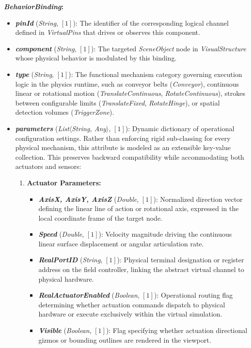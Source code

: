 \textbf{\textit{BehaviorBinding}:}
\begin{itemize}
    \item \textbf{\textit{pinId}} (\textit{String}, $[1]$): The identifier of the corresponding logical channel defined in \textit{VirtualPins} that drives or observes this component.
    \item \textbf{\textit{component}} (\textit{String}, $[1]$): The targeted \textit{SceneObject} node in \textit{VisualStructure} whose physical behavior is modulated by this binding.
    \item \textbf{\textit{type}} (\textit{String}, $[1]$): The functional mechanism category governing execution logic in the physics runtime, such as conveyor belts (\textit{Conveyor}), continuous linear or rotational motion (\textit{TranslateContinuous}, \textit{RotateContinuous}), strokes between configurable limits (\textit{TranslateFixed}, \textit{RotateHinge}), or spatial detection volumes (\textit{TriggerZone}).
    \item \textbf{\textit{parameters}} (\textit{List$\langle$String, Any$\rangle$}, $[1]$): Dynamic dictionary of operational configuration settings. Rather than enforcing rigid sub-classing for every physical mechanism, this attribute is modeled as an extensible key-value collection. This preserves backward compatibility while accommodating both actuators and sensors:
    \begin{enumerate}
        \item \textbf{Actuator Parameters:}
        \begin{itemize}
            \item \textbf{\textit{AxisX, AxisY, AxisZ}} (\textit{Double}, $[1]$): Normalized direction vector defining the linear line of action or rotational axis, expressed in the local coordinate frame of the target node.
            \item \textbf{\textit{Speed}} (\textit{Double}, $[1]$): Velocity magnitude driving the continuous linear surface displacement or angular articulation rate.
            \item \textbf{\textit{RealPortID}} (\textit{String}, $[1]$): Physical terminal designation or register address on the field controller, linking the abstract virtual channel to physical hardware.
            \item \textbf{\textit{RealActuatorEnabled}} (\textit{Boolean}, $[1]$): Operational routing flag determining whether actuation commands dispatch to physical hardware or execute exclusively within the virtual simulation.
            \item \textbf{\textit{Visible}} (\textit{Boolean}, $[1]$): Flag specifying whether actuation directional gizmos or bounding outlines are rendered in the viewport.
        \end{itemize}


\end{enumerate}
\end{itemize}
